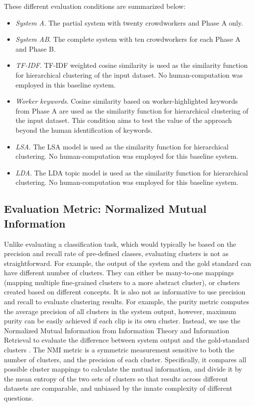 These different evaluation conditions are summarized below:

\begin{itemize}
	\item \emph{System A}. The partial system with twenty crowdworkers and
		Phase A only.
	\item \emph{System AB}. The complete system with ten crowdworkers for each
		Phase A and Phase B.
	\item \emph{TF-IDF}. TF-IDF weighted cosine similarity is used as the
		similarity function for hierarchical clustering of the input dataset.
		No human-computation was employed in this baseline system.
	\item \emph{Worker keywords}. Cosine similarity based on worker-highlighted keywords from Phase A are used as the
		similarity function for hierarchical clustering of the input dataset. This condition aims to test the value of the approach beyond the human identification of keywords.
	\item \emph{LSA}. The LSA model is used as the similarity function for
		hierarchical clustering.  No human-computation was employed for this
		baseline system.
	\item \emph{LDA}. The LDA topic model is used as the similarity function
		for hierarchical clustering.  No human-computation was employed for
		this baseline system.
\end{itemize}

\subsection{Evaluation Metric: Normalized Mutual Information}

Unlike evaluating a classification task, which would typically be based on
the precision and recall rate of pre-defined classes, evaluating clusters is not as
straightforward. For example, the output of the system and the gold standard
can have different number of clusters. They can either be many-to-one mappings
(mapping multiple fine-grained clusters to a more abstract cluster), or
clusters created based on different concepts. It is also not as informative to
use precision and recall to evaluate clustering results. For example, the
purity metric computes the average precision of all clusters in the system
output, however, maximum purity can be easily achieved if each clip is its own
cluster. Instead, we use the Normalized Mutual Information from Information
Theory and Information Retrieval to evaluate the difference between system
output and the gold-standard clusters \cite{manning2008introduction}. The NMI
metric is a symmetric measurement sensitive to both the number of clusters, and
the precision of each cluster.  Specifically, it compares all possible
cluster mappings to calculate the mutual information, and divide it by the mean
entropy of the two sets of clusters so that results across different datasets
are comparable, and unbiased by the innate complexity of different
questions.

